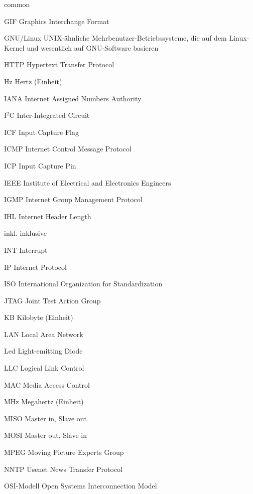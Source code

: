 \begin{bfscript}{common}
	\item[GIF] Graphics Interchange Format
	\item[GNU/Linux] UNIX-ähnliche Mehrbenutzer-Betriebssysteme, die auf dem Linux-Kernel und wesentlich auf GNU-Software basieren

	\item[HTTP] Hypertext Transfer Protocol
	\item[Hz] Hertz (Einheit)

	\item[IANA] Internet Assigned Numbers Authority
	\item[I$^2$C] Inter-Integrated Circuit
	\item[ICF] Input Capture Flag
	\item[ICMP] Internet Control Message Protocol
	\item[ICP] Input Capture Pin
	\item[IEEE] Institute of Electrical and Electronics Engineers
	\item[IGMP] Internet Group Management Protocol
	\item[IHL] Internet Header Length
	\item[inkl.] inklusive
	\item[INT] Interrupt
	\item[IP] Internet Protocol
	\item[ISO] International Organization for Standardization
	
	\item[JTAG] Joint Test Action Group

	\item[KB] Kilobyte (Einheit)

	\item[LAN] Local Area Network
	\item[Led] Light-emitting Diode
	\item[LLC] Logical Link Control

	\item[MAC] Media Access Control
	\item[MHz] Megahertz (Einheit)
	\item[MISO] Master in, Slave out
	\item[MOSI] Master out, Slave in
	\item[MPEG] Moving Picture Experts Group

	\item[NNTP] Usenet News Transfer Protocol

	\item[OSI-Modell] Open Systems Interconnection Model


\end{bfscript}
